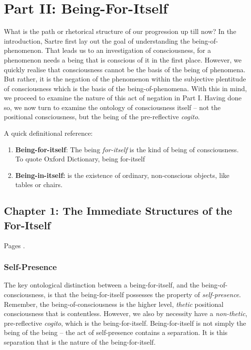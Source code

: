 \chapter{Part II: Being-For-Itself}

What is the path or rhetorical structure of our progression up till now? In the introduction, Sartre first lay out the goal of understanding the being-of-phenomenon. That leads us to an investigation of consciousness, for a phenomenon needs a being that is conscious of it in the first place. However, we quickly realise that consciousness cannot be the basis of the being of phenomena. But rather, it is the negation of the phenomenon within the subjective plentitude of consciousness which is the basis of the being-of-phenomena. With this in mind, we proceed to examine the nature of this act of negation in Part I. Having done so, we now turn to examine the ontology of consciousness itself -- not the positional consciousness, but the being of the pre-reflective \emph{cogito}.

\noindent
A quick definitional reference:

\begin{enumerate}
  \item \textbf{Being-for-itself}: The being \emph{for-itself} is the kind of being of consciousness. To quote Oxford Dictionary, being for-itself 
  \item \textbf{Being-in-itself:} is the existence of ordinary, non-conscious objects, like tables or chairs.
\end{enumerate}

\section{Chapter 1: The Immediate Structures of the For-Itself}

Pages \autocite[121 -- 162]{sartre}.

\subsection{Self-Presence}

The key ontological distinction between a being-for-itself, and the being-of-consciousness, is that the being-for-itself possesses the property of \emph{self-presence}. Remember, the being-of-consciousness is the higher level, \emph{thetic} positional consciousness that is contentless. However, we also by necessity have a \emph{non-thetic}, pre-reflective \emph{cogito}, which is the being-for-itself. Being-for-itself is not simply the being of the being -- the act of self-presence contains a separation. It is this separation that is the nature of the being-for-itself.

